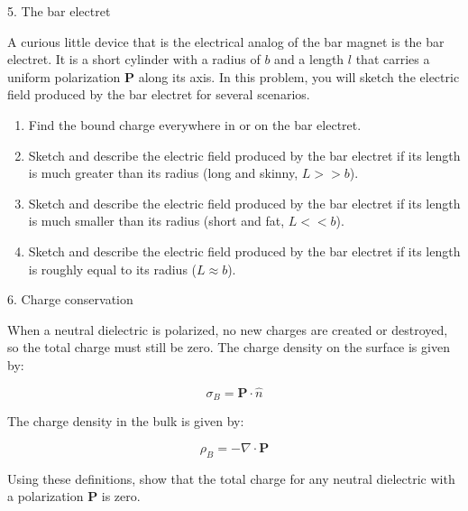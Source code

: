 \documentclass[11pt]{article}
\def\tightlist{}
\begin{document}
{\Large 5. The bar electret}\label{the-bar-electret}

A curious little device that is the electrical analog of the bar magnet
is the bar electret. It is a short cylinder with a radius of \(b\) and a
length \(l\) that carries a uniform polarization \(\mathbf{P}\) along
its axis. In this problem, you will sketch the electric field produced
by the bar electret for several scenarios.

\begin{enumerate}
\def\labelenumi{\arabic{enumi}.}
\tightlist
\item
  Find the bound charge everywhere in or on the bar electret.
\item
  Sketch and describe the electric field produced by the bar electret if
  its length is much greater than its radius (long and skinny,
  \(L>>b\)).
\item
  Sketch and describe the electric field produced by the bar electret if
  its length is much smaller than its radius (short and fat, \(L<<b\)).
\item
  Sketch and describe the electric field produced by the bar electret if
  its length is roughly equal to its radius (\(L\approx b\)).
\end{enumerate}

{\Large 6. Charge conservation}\label{charge-conservation}

When a neutral dielectric is polarized, no new charges are created or
destroyed, so the total charge must still be zero. The charge density on
the surface is given by:

\[\sigma_B = \mathbf{P}\cdot\hat{n}\]

The charge density in the bulk is given by:

\[\rho_B = -\nabla \cdot \mathbf{P}\]

Using these definitions, show that the total charge for any neutral
dielectric with a polarization \(\mathbf{P}\) is zero.
\end{document}
